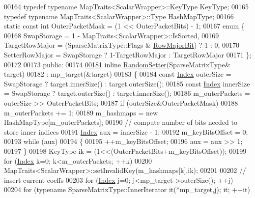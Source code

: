 \begin{DoxyCode}
00164     \textcolor{keyword}{typedef} \textcolor{keyword}{typename} MapTraits<ScalarWrapper>::KeyType KeyType;
00165     \textcolor{keyword}{typedef} \textcolor{keyword}{typename} MapTraits<ScalarWrapper>::Type HashMapType;
00166     \textcolor{keyword}{static} \textcolor{keyword}{const} \textcolor{keywordtype}{int} OuterPacketMask = (1 << OuterPacketBits) - 1;
00167     \textcolor{keyword}{enum} \{
00168       SwapStorage = 1 - MapTraits<ScalarWrapper>::IsSorted,
00169       TargetRowMajor = (SparseMatrixType::Flags & \hyperlink{group__flags_gae4f56c2a60bbe4bd2e44c5b19cbe8762}{RowMajorBit}) ? 1 : 0,
00170       SetterRowMajor = SwapStorage ? 1-TargetRowMajor : TargetRowMajor
00171     \};
00172 
00173   \textcolor{keyword}{public}:
00174 
\hyperlink{class_eigen_1_1_random_setter_a62e960bd52cec62a59ebb285f381138f}{00181}     \textcolor{keyword}{inline} \hyperlink{class_eigen_1_1_random_setter_a62e960bd52cec62a59ebb285f381138f}{RandomSetter}(SparseMatrixType& target)
00182       : mp\_target(&target)
00183     \{
00184       \textcolor{keyword}{const} \hyperlink{namespace_eigen_a62e77e0933482dafde8fe197d9a2cfde}{Index} outerSize = SwapStorage ? target.innerSize() : target.outerSize();
00185       \textcolor{keyword}{const} \hyperlink{namespace_eigen_a62e77e0933482dafde8fe197d9a2cfde}{Index} innerSize = SwapStorage ? target.outerSize() : target.innerSize();
00186       m\_outerPackets = outerSize >> OuterPacketBits;
00187       \textcolor{keywordflow}{if} (outerSize&OuterPacketMask)
00188         m\_outerPackets += 1;
00189       m\_hashmaps = \textcolor{keyword}{new} HashMapType[m\_outerPackets];
00190       \textcolor{comment}{// compute number of bits needed to store inner indices}
00191       \hyperlink{namespace_eigen_a62e77e0933482dafde8fe197d9a2cfde}{Index} aux = innerSize - 1;
00192       m\_keyBitsOffset = 0;
00193       \textcolor{keywordflow}{while} (aux)
00194       \{
00195         ++m\_keyBitsOffset;
00196         aux = aux >> 1;
00197       \}
00198       KeyType ik = (1<<(OuterPacketBits+m\_keyBitsOffset));
00199       \textcolor{keywordflow}{for} (\hyperlink{namespace_eigen_a62e77e0933482dafde8fe197d9a2cfde}{Index} k=0; k<m\_outerPackets; ++k)
00200         MapTraits<ScalarWrapper>::setInvalidKey(m\_hashmaps[k],ik);
00201 
00202       \textcolor{comment}{// insert current coeffs}
00203       \textcolor{keywordflow}{for} (\hyperlink{namespace_eigen_a62e77e0933482dafde8fe197d9a2cfde}{Index} j=0; j<mp\_target->outerSize(); ++j)
00204         \textcolor{keywordflow}{for} (\textcolor{keyword}{typename} SparseMatrixType::InnerIterator it(*mp\_target,j); it; ++it)

\end{DoxyCode}
